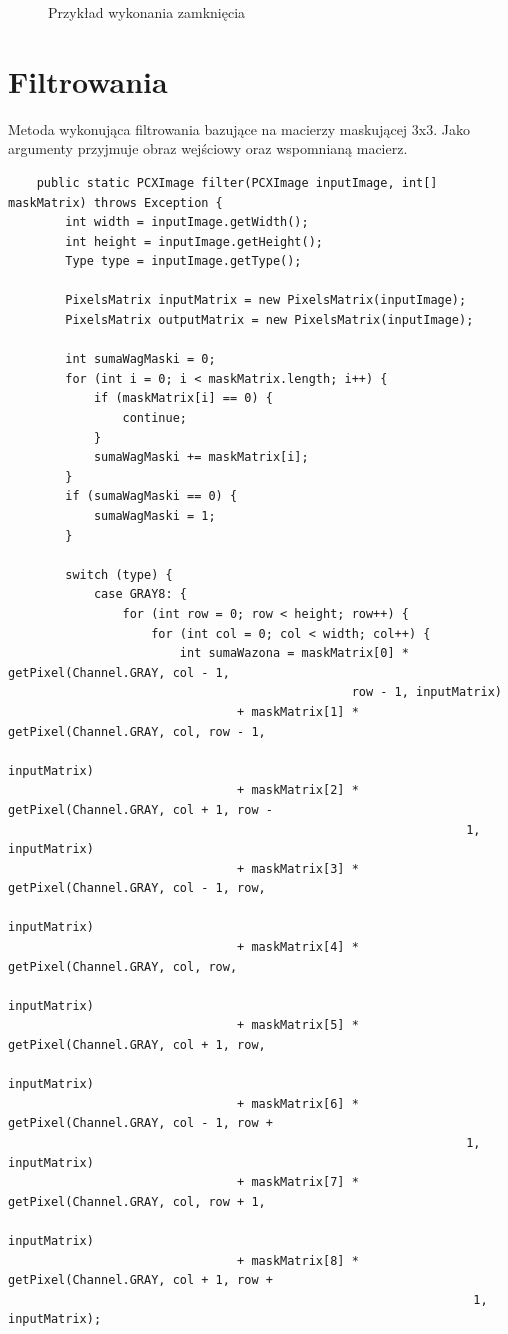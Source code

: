 \documentclass{article}
\begin{document}
\begin{figure}[!ht]
	\caption{Przykład wykonania zamknięcia}
	\label{fig20}	
	\end{figure}	


	\section{Filtrowania}
	Metoda wykonująca filtrowania bazujące na macierzy maskującej 3x3. Jako argumenty przyjmuje obraz wejściowy oraz wspomnianą macierz.
	\begin{verbatim}
	public static PCXImage filter(PCXImage inputImage, int[] maskMatrix) throws Exception {
        int width = inputImage.getWidth();
        int height = inputImage.getHeight();
        Type type = inputImage.getType();

        PixelsMatrix inputMatrix = new PixelsMatrix(inputImage);
        PixelsMatrix outputMatrix = new PixelsMatrix(inputImage);

        int sumaWagMaski = 0;
        for (int i = 0; i < maskMatrix.length; i++) {
            if (maskMatrix[i] == 0) {
                continue;
            }
            sumaWagMaski += maskMatrix[i];
        }
        if (sumaWagMaski == 0) {
            sumaWagMaski = 1;
        }

        switch (type) {
            case GRAY8: {
                for (int row = 0; row < height; row++) {  
                    for (int col = 0; col < width; col++) {
                        int sumaWazona = maskMatrix[0] * getPixel(Channel.GRAY, col - 1, 
												row - 1, inputMatrix)
                                + maskMatrix[1] * getPixel(Channel.GRAY, col, row - 1, 
																inputMatrix)
                                + maskMatrix[2] * getPixel(Channel.GRAY, col + 1, row -
																1, inputMatrix)
                                + maskMatrix[3] * getPixel(Channel.GRAY, col - 1, row,
																inputMatrix)
                                + maskMatrix[4] * getPixel(Channel.GRAY, col, row, 
																inputMatrix)
                                + maskMatrix[5] * getPixel(Channel.GRAY, col + 1, row, 
																inputMatrix)
                                + maskMatrix[6] * getPixel(Channel.GRAY, col - 1, row +
																1, inputMatrix)
                                + maskMatrix[7] * getPixel(Channel.GRAY, col, row + 1, 
																inputMatrix)
                                + maskMatrix[8] * getPixel(Channel.GRAY, col + 1, row +
																 1, inputMatrix);


\end{verbatim}
\end{document}

